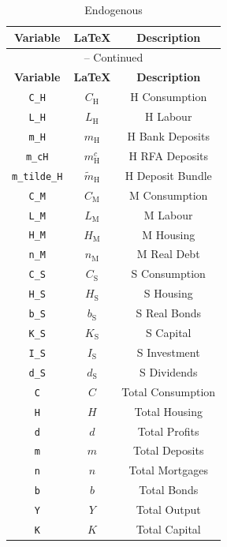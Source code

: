 \begin{center}
\begin{longtable}{ccc}
\caption{Endogenous}\\%
\hline%
\multicolumn{1}{c}{\textbf{Variable}} &
\multicolumn{1}{c}{\textbf{\LaTeX}} &
\multicolumn{1}{c}{\textbf{Description}}\\%
\hline\hline%
\endfirsthead
\multicolumn{3}{c}{{\tablename} \thetable{} -- Continued}\\%
\hline%
\multicolumn{1}{c}{\textbf{Variable}} &
\multicolumn{1}{c}{\textbf{\LaTeX}} &
\multicolumn{1}{c}{\textbf{Description}}\\%
\hline\hline%
\endhead
\texttt{C\_H} & $C_\mathrm{H}$ & H Consumption\\
\texttt{L\_H} & $L_\mathrm{H}$ & H Labour\\
\texttt{m\_H} & $m_\mathrm{H}$ & H Bank Deposits\\
\texttt{m\_cH} & $m^c_\mathrm{H}$ & H RFA Deposits\\
\texttt{m\_tilde\_H} & $\widetilde{m}_\mathrm{H}$ & H Deposit Bundle\\
\texttt{C\_M} & $C_\mathrm{M}$ & M Consumption\\
\texttt{L\_M} & $L_\mathrm{M}$ & M Labour\\
\texttt{H\_M} & $H_\mathrm{M}$ & M Housing\\
\texttt{n\_M} & $n_\mathrm{M}$ & M Real Debt\\
\texttt{C\_S} & $C_\mathrm{S}$ & S Consumption\\
\texttt{H\_S} & $H_\mathrm{S}$ & S Housing\\
\texttt{b\_S} & $b_\mathrm{S}$ & S Real Bonds\\
\texttt{K\_S} & $K_\mathrm{S}$ & S Capital\\
\texttt{I\_S} & $I_\mathrm{S}$ & S Investment\\
\texttt{d\_S} & $d_\mathrm{S}$ & S Dividends\\
\texttt{C} & $C$ & Total Consumption\\
\texttt{H} & $H$ & Total Housing\\
\texttt{d} & $d$ & Total Profits\\
\texttt{m} & $m$ & Total Deposits\\
\texttt{n} & $n$ & Total Mortgages\\
\texttt{b} & $b$ & Total Bonds\\
\texttt{Y} & $Y$ & Total Output\\
\texttt{K} & $K$ & Total Capital\\

\end{longtable}
\end{center}
